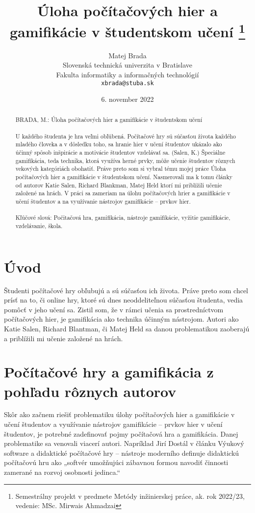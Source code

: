 \documentclass[10pt,slovak,a4paper]{article}
\title{Úloha počítačových hier a gamifikácie v študentskom učení
\thanks{Semestrálny projekt v predmete Metódy inžinierskej práce, ak. rok 2022/23, vedenie: MSc. Mirwais Ahmadzai}} %
\author{Matej Brada\\[2pt]
	{\small Slovenská technická univerzita v Bratislave}\\
	{\small Fakulta informatiky a informačných technológií}\\
	{\small \texttt{xbrada@stuba.sk}}
	}
\date{\small 6. november 2022}
\begin{document}
\maketitle

\begin{abstract}
BRADA, M.: Úloha počítačových hier a gamifikácie v študentskom učení
\\\\
U každého študenta je hra veľmi obľúbená. Počítačové hry sú súčasťou života každého mladého človeka a v dôsledku toho, sa hranie hier v učení študentov ukázalo ako účinný spôsob inšpirácie a motivácie študentov vzdelávať sa. (Salen, K.) Špeciálne gamifikácia, teda
technika, ktorá využíva herné prvky, môže učenie študentov rôznych vekových kategóriách
obohatiť. Práve preto som si vybral tému mojej práce Úloha počítačových hier a gamifikácie v študentskom učení. Nasmerovali ma k tomu články od autorov Katie Salen, Richard Blankman, Matej Held ktorí mi priblížili učenie založené na hrách. V práci sa zameriam na úlohu počítačových hrier a gamifikácie v učení študentov a na využívanie nástrojov gamifikácie – prvkov hier.
\\\\
	Kľúčové slová: Počitačová hra, gamifikácia, nástroje gamifikácie, vyžitie gamifikácie, vzdelávanie, škola. 

\end{abstract}
\newpage
\renewcommand*\contentsname{Obsah}
\maketitle
\tableofcontents
\newpage
\section{Úvod}
\noindent
\hspace*{1.5em}
Študenti počítačové hry obľubujú a sú súčasťou ich života. Práve preto som chcel prísť na to, či online hry, ktoré sú dnes neoddeliteľnou súčasťou študenta, vedia pomôcť v jeho učení sa. Zistil som, že v rámci učenia sa prostredníctvom počítačových hier, je gamifikácia ako technika účinným nástrojom. Autori ako Katie Salen, Richard Blantman, či Matej Held sa danou problematikou zaoberajú a priblížili mi učenie založené na hrách. \\

\section{Počítačové hry a gamifikácia z pohľadu rôznych autorov} \label{ina}
\noindent
\hspace*{1.5em}
Skôr ako začnem riešiť problematiku úlohy počítačových hier a gamifikácie v učení študentov a využívanie nástrojov gamifikácie – prvkov hier v učení študentov, je potrebné zadefinovať pojmy počítačová hra a gamifikácia. Danej problematike sa venovali viacerí autori. Napríklad Jirí Dostál v článku Výukový software a didaktické počítačové hry – nástroje moderního definuje didaktickú počítačovú hru ako „softvér umožňujúci zábavnou formou navodiť činnosti zamerané na rozvoj osobnosti jedinca.“ \cite{cite10}
\end{document}
